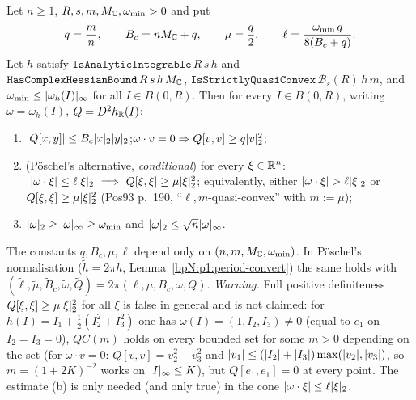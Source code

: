 \begin{lemma}\label{bpN:p1:qc-convert}
Let $n\ge1$, $R,s,m,M_{\mathbb{C}},\omega_{\min}>0$ and put
\[q=\frac mn,\qquad B_c=nM_{\mathbb{C}}+q,\qquad\mu=\frac q2,\qquad \ell=\frac{\omega_{\min}\,q}{8(B_c+q)}.\]
Let $h$ satisfy $\texttt{IsAnalyticIntegrable}\,R\,s\,h$ and $\texttt{HasComplexHessianBound}\,R\,s\,h\,M_{\mathbb{C}}$, $\texttt{IsStrictlyQuasiConvex}\,\mathcal B_s(R)\,h\,m$, and $\omega_{\min}\le\lvert \omega_h(I)\rvert_\infty$ for all $I\in B(0,R)$. Then for every
$I\in B(0,R)$, writing $\omega=\omega_h(I)$, $Q=D^2h_{\mathbb{R}}(I)$:
\begin{enumerate}[label=(\alph*)]
\item $\lvert Q[x,y]\rvert\le B_c\lvert x\rvert_2\lvert y\rvert_2$;\quad $\omega\cdot v=0\Rightarrow Q[v,v]\ge q\lvert v\rvert_2^2$;
\item (P\"oschel's alternative, \emph{conditional}) for every $\xi\in\mathbb{R}^n$: $\ \abs{\omega\cdot\xi}\le\ell\abs\xi_2\ \Longrightarrow\ Q[\xi,\xi]\ge\mu\abs\xi_2^2$; equivalently, either
  $\lvert \omega\cdot\xi\rvert>\ell\lvert \xi\rvert_2$ or $Q[\xi,\xi]\ge\mu\lvert \xi\rvert_2^2$ (Pos93 p.~190, ``$\ell,m$-quasi-convex'' with $m:=\mu$);
\item $\lvert \omega\rvert_2\ge\lvert \omega\rvert_\infty\ge\omega_{\min}$ and $\lvert \omega\rvert_2\le\sqrt n\lvert \omega\rvert_\infty$.
\end{enumerate}
The constants $q,B_c,\mu,\ell$ depend only on $(n,m,M_{\mathbb{C}},\omega_{\min})$. In P\"oschel's normalisation ($\tilde h=2\pi h$, Lemma~\ref{bpN:p1:period-convert}) the same holds with $(\tilde\ell,\tilde\mu,\tilde B_c,\tilde\omega,\tilde Q)=2\pi(\ell,\mu,B_c,\omega,Q)$.
\emph{Warning.} Full positive definiteness $Q[\xi,\xi]\ge\mu\lvert \xi\rvert_2^2$ for all $\xi$ is false in general and is not claimed: for $h(I)=I_1+\tfrac12(I_2^2+I_3^2)$ one has $\omega(I)=(1,I_2,I_3)\ne0$ (equal to $e_1$ on $I_2=I_3=0$), $QC(m)$ holds on every bounded set for some $m>0$ depending on the set (for $\omega\cdot v=0$: $Q[v,v]=v_2^2+v_3^2$ and $\lvert v_1\rvert\le(\lvert I_2\rvert+\lvert I_3\rvert)\max(\lvert v_2\rvert,\lvert v_3\rvert)$, so $m=(1+2K)^{-2}$ works on $\lvert I\rvert_\infty\le K$), but $Q[e_1,e_1]=0$ at every point. The estimate (b) is only needed (and only true) in the cone $\lvert \omega\cdot\xi\rvert\le\ell\lvert \xi\rvert_2$.
\end{lemma}
